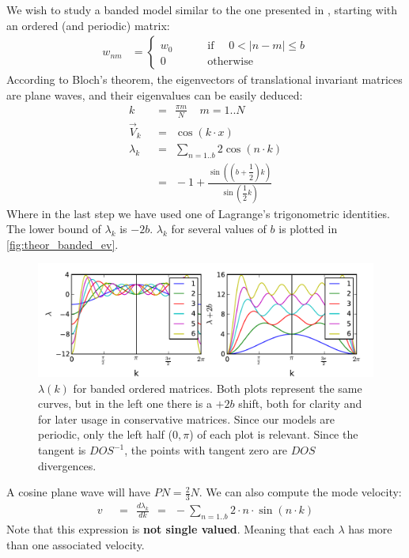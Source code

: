 \documentclass[onecolumn,fleqn,longbibliography]{revtex4}
\begin{document}
We wish to study a banded model similar to the one presented in \cite{bodyfelt_scaling_2013},
starting with an ordered (and periodic) matrix:
%
\begin{align}\label{eq:ordered}
w_{nm} &= \begin{cases}
  w_0 &\qquad \textrm{ if  } \quad 0<|n-m|\le b \\
  0 &\qquad \textrm{ otherwise}
\end{cases}
\end{align}
%
According to Bloch's theorem, the eigenvectors of translational invariant
matrices are plane waves, and their eigenvalues can be easily deduced:
\begin{align}
k\ \  &=\ \  \frac{\pi m}{N} \ \ \ \ \ m=1..N \\
\vec{V}_k\ \  &=\ \  \cos(k\cdot x)\\
\lambda_k\ \  &=\ \  \sum_{n=1..b} 2\cos(n\cdot k) \\
&= \ \ -1 + \frac{\sin((b+\dfrac{1}{2})k)}{\sin(\dfrac{1}{2}k)}
\end{align}  
Where in the last step we have used one of Lagrange's trigonometric identities. 
The lower bound of $\lambda_k$ is $-2b$. 
$\lambda_k$ for several values of $b$ is plotted in \autoref{fig:theor_banded_ev}.

\begin{figure}[H]
    \includegraphics{pta_theor_banded_ev}
    \caption{$\lambda(k)$ for banded ordered matrices. Both plots
    represent the same curves, but in the left one there is a $+2b$ shift, both for clarity 
    and for later usage in conservative matrices. Since our 
    models are periodic, only the left half ($0,\pi$) of each plot is relevant. Since 
    the tangent is $DOS^{-1}$, the points with tangent zero are $DOS$ divergences.
    }
    \label{fig:theor_banded_ev}
\end{figure}



A cosine plane wave will have $PN= \frac{2}{3}N$. We can also compute the mode velocity:
\begin{align}
v \ \ &=\ \ \frac{d\lambda_k}{dk} \ \ =\ \ -\sum_{n=1..b} 2\cdot n\cdot \sin(n\cdot k)
\end{align}
Note that this expression is {\bf not single valued}. Meaning that each $\lambda$ 
has more than one associated velocity. 
\end{document}
